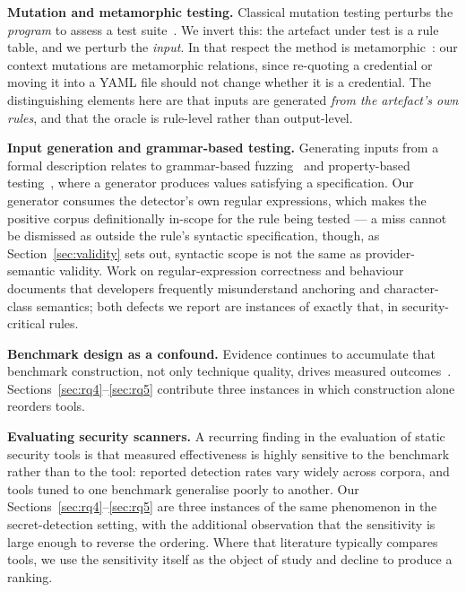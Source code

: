 \documentclass[journal]{IEEEtran}
\begin{document}
\textbf{Mutation and metamorphic testing.} Classical mutation testing perturbs the \emph{program} to assess a test suite~\cite{jia2011,demillo1978}. We invert this: the artefact under test is a rule table, and we perturb the \emph{input}. In that respect the method is metamorphic~\cite{chen2018metamorphic,segura2016}: our context mutations are metamorphic relations, since re-quoting a credential or moving it into a YAML file should not change whether it is a credential. The distinguishing elements here are that inputs are generated \emph{from the artefact's own rules}, and that the oracle is rule-level rather than output-level.

\textbf{Input generation and grammar-based testing.} Generating inputs from a formal description relates to grammar-based fuzzing~\cite{godefroid2008} and property-based testing~\cite{claessen2000}, where a generator produces values satisfying a specification. Our generator consumes the detector's own regular expressions, which makes the positive corpus definitionally in-scope for the rule being tested --- a miss cannot be dismissed as outside the rule's syntactic specification, though, as Section~\ref{sec:validity} sets out, syntactic scope is not the same as provider-semantic validity. Work on regular-expression correctness and behaviour~\cite{chapman2016,michael2019} documents that developers frequently misunderstand anchoring and character-class semantics; both defects we report are instances of exactly that, in security-critical rules.

\textbf{Benchmark design as a confound.} Evidence continues to accumulate that benchmark construction, not only technique quality, drives measured outcomes~\cite{liem2020,herbold2020}. Sections~\ref{sec:rq4}--\ref{sec:rq5} contribute three instances in which construction alone reorders tools.

\textbf{Evaluating security scanners.} A recurring finding in the evaluation of static security tools is that measured effectiveness is highly sensitive to the benchmark rather than to the tool: reported detection rates vary widely across corpora, and tools tuned to one benchmark generalise poorly to another. Our Sections~\ref{sec:rq4}--\ref{sec:rq5} are three instances of the same phenomenon in the secret-detection setting, with the additional observation that the sensitivity is large enough to reverse the ordering. Where that literature typically compares tools, we use the sensitivity itself as the object of study and decline to produce a ranking.
\end{document}

